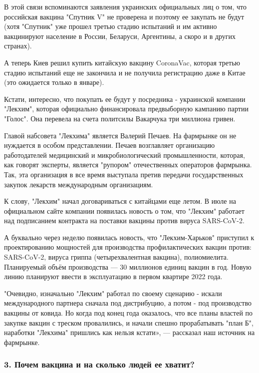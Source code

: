В этой связи вспоминаются заявления украинских официальных лиц о том, что
российская вакцина "Спутник V" не проверена и поэтому ее закупать не будут
(хотя "Спутник" уже прошел третью стадию испытаний и им активно вакцинируют
население в России, Беларуси, Аргентины, а скоро и в других странах).

А теперь Киев решил купить китайскую вакцину CoronaVac, которая третью стадию
испытаний еще не закончила и не получила регистрацию даже в Китае (это
ожидается только в январе).  

Кстати, интересно, что покупать ее будут у посредника - украинской компании
"Лекхим", которая официально финансировала предвыборную кампанию партии
"Голос". Она перевела на счета политсилы Вакарчука три миллиона гривен. 

Главой набсовета "Лекхима" является Валерий Печаев. На фармрынке он не
нуждается в особом представлении. Печаев возглавляет организацию работодателей
медицинский и микробиологический промышленности, которая, как говорят эксперты,
является "рупором" отечественных операторов фармрынка. Так, эта организация в
все время выступала претив передачи государственных закупок лекарств
международным организациям.

К слову, "Лекхим" начал договариваться с китайцами еще летом. В июле на
официальном сайте компании появилась новость о том, что "Лекхим" работает над
подписанием контракта на поставки вакцины против вируса SARS-CoV-2. 

А буквально через неделю появилась новость, что "Лекхим-Харьков" приступил к
проектированию мощностей для производства профилактических вакцин против:
SARS-CoV-2, вируса гриппа (четырехвалентная вакцина), полиомиелита. Планируемый
объём производства — 30 миллионов единиц вакцин в год. Новую линию планируют
ввести в эксплуатацию в первом квартире 2022 года.

"Очевидно, изначально "Лекхим" работал по своему сценарию - искали
международного партнера сначала под дистрибуцию, а потом - под производство
вакцины от ковида. Но когда под конец года оказалось, что все планы властей по
закупке вакцин с треском провалились, и начали спешно прорабатывать "план Б",
наработки "Лекхима" пришлись как нельзя кстати», — рассказал наш источник на
фармрынке.

\subsubsection{3. Почем вакцина и на сколько людей ее хватит?}

